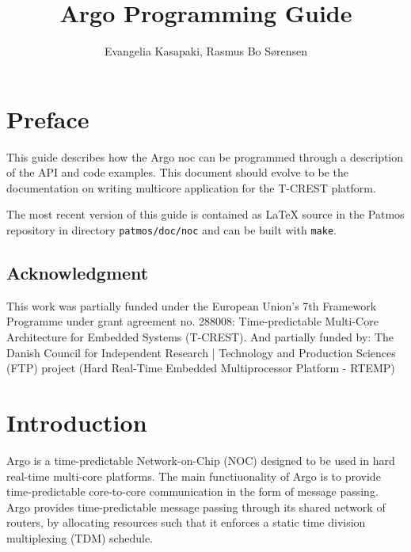 \documentclass[a4paper,fontsize=10pt,twoside,DIV15,BCOR12mm,headinclude=true,footinclude=false,pagesize,bibtotoc]{scrbook}
\newcommand{\code}[1]{{\texttt{#1}}}
\newcommand{\todo}[1]{{\emph{TODO: #1}}}
\begin{document}
\title{Argo Programming Guide}

\author{Evangelia Kasapaki,  Rasmus Bo S{\o}rensen}

\lowertitleback{\todo{Copyright and license terms come here.}}

\frontmatter

\maketitle

\chapter{Preface}

This guide describes how the Argo noc can be programmed through a description of the API and code examples.
This document should evolve to be the documentation on writing multicore application for the T-CREST platform.

The most recent version of this guide is contained as LaTeX source in the Patmos repository in directory
\code{patmos/doc/noc} and can be built with \code{make}.

\section*{Acknowledgment}
This work was partially funded under the
European Union's 7th Framework Programme
under grant agreement no. 288008:
Time-predictable Multi-Core Architecture for Embedded
Systems (T-CREST).
And partially funded by:
The Danish Council for Independent Research | Technology and Production Sciences (FTP) 
project (Hard Real-Time Embedded Multiprocessor Platform - RTEMP)

\tableofcontents

\begingroup
\let\cleardoublepage\clearpage
\listoffigures
\listoftables
\endgroup

\mainmatter

\chapter{Introduction}

Argo is a time-predictable Network-on-Chip (NOC) designed to be used in hard real-time multi-core platforms.
The main functiuonality of Argo is to provide time-predictable core-to-core communication in the form of message passing.
Argo provides time-predictable message passing through its shared network of routers,
by allocating resources such that it enforces a static time division multiplexing (TDM) schedule.
\end{document}
